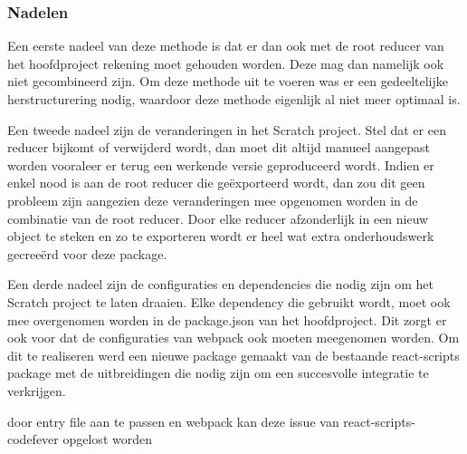 \subsubsection{Nadelen}
Een eerste nadeel van deze methode is dat er dan ook met de root reducer van het hoofdproject rekening moet gehouden worden. Deze mag dan namelijk ook niet gecombineerd zijn. Om deze methode uit te voeren was er een gedeeltelijke herstructurering nodig, waardoor deze methode eigenlijk al niet meer optimaal is. 

Een tweede nadeel zijn de veranderingen in het Scratch project. Stel dat er een reducer bijkomt of verwijderd wordt, dan moet dit altijd manueel aangepast worden vooraleer er terug een werkende versie geproduceerd wordt. Indien er enkel nood is aan de root reducer die geëxporteerd wordt, dan zou dit geen probleem zijn aangezien deze veranderingen mee opgenomen worden in de combinatie van de root reducer. Door elke reducer afzonderlijk in een nieuw object te steken en zo te exporteren wordt er heel wat extra onderhoudswerk gecreeërd voor deze package.  

Een derde nadeel zijn de configuraties en dependencies die nodig zijn om het Scratch project te laten draaien. 
Elke dependency die gebruikt wordt, moet ook mee overgenomen worden in de package.json van het hoofdproject. Dit zorgt er ook voor dat de configuraties van webpack ook moeten meegenomen worden. Om dit te realiseren werd een nieuwe package gemaakt van de bestaande react-scripts package met de uitbreidingen die nodig zijn om een succesvolle integratie te verkrijgen.

door entry file aan te passen en webpack kan deze issue van react-scripts-codefever opgelost worden



